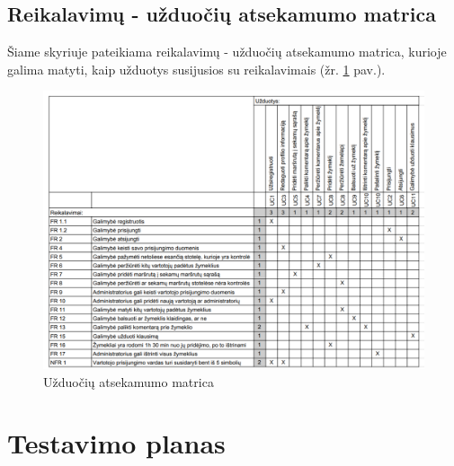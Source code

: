 \documentclass{VUMIFPSkursinis}
\begin{document}
\subsection{Reikalavimų - užduočių atsekamumo matrica}
Šiame skyriuje pateikiama reikalavimų - užduočių atsekamumo matrica, kurioje galima matyti, kaip užduotys susijusios su reikalavimais (žr. \ref{img:Užduočių matrica} pav.).
	\begin{figure}[H]
				\centering
				\includegraphics[scale=0.4]{img/uzduociu_matrica}
				\caption{Užduočių atsekamumo matrica}
				\label{img:Užduočių matrica}
			\end{figure}

\section{Testavimo planas}
\end{document}
